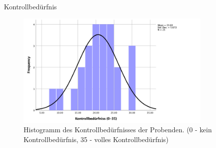 \documentclass[10pt]{beamer}
\begin{document}
	\begin{frame}{Kontrollbedürfnis}
		\begin{figure}
			\includegraphics[width=0.85\textwidth]{graphics/histogramm_need-for-control.png}
			\caption{
				\label{fig:histogramm_need-for-control.png} 
				Histogramm des Kontrollbedürfnisses der Probenden. (0 - kein Kontrollbedürfnis, 35 - volles Kontrollbedürfnis)
			}
		\end{figure}
	\end{frame}

\end{document}
